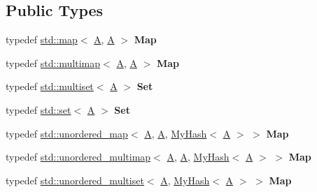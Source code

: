 \subsection*{Public Types}
\begin{DoxyCompactItemize}
\item 
\mbox{\label{struct_a_ac2592255bb77167f73795fba79ede1ea}} 
typedef \mbox{\hyperlink{classstd_1_1map}{std\+::map}}$<$ \mbox{\hyperlink{struct_a}{A}}, \mbox{\hyperlink{struct_a}{A}} $>$ {\bfseries Map}
\item 
\mbox{\label{struct_a_a9c1ebc47bec4cd6aba82fd759a0db654}} 
typedef \mbox{\hyperlink{classstd_1_1multimap}{std\+::multimap}}$<$ \mbox{\hyperlink{struct_a}{A}}, \mbox{\hyperlink{struct_a}{A}} $>$ {\bfseries Map}
\item 
\mbox{\label{struct_a_aa23dfbc23c3121c3321f87ab2245efbb}} 
typedef \mbox{\hyperlink{classstd_1_1multiset}{std\+::multiset}}$<$ \mbox{\hyperlink{struct_a}{A}} $>$ {\bfseries Set}
\item 
\mbox{\label{struct_a_a2d547aef0a54b129cbd44064296c425b}} 
typedef \mbox{\hyperlink{classstd_1_1set}{std\+::set}}$<$ \mbox{\hyperlink{struct_a}{A}} $>$ {\bfseries Set}
\item 
\mbox{\label{struct_a_a95808cd6576c1c045edcd5d4c1875614}} 
typedef \mbox{\hyperlink{classstd_1_1unordered__map}{std\+::unordered\+\_\+map}}$<$ \mbox{\hyperlink{struct_a}{A}}, \mbox{\hyperlink{struct_a}{A}}, \mbox{\hyperlink{struct_my_hash}{My\+Hash}}$<$ \mbox{\hyperlink{struct_a}{A}} $>$ $>$ {\bfseries Map}
\item 
\mbox{\label{struct_a_a6422cb69984deaa01771e492aca37bc1}} 
typedef \mbox{\hyperlink{classstd_1_1unordered__multimap}{std\+::unordered\+\_\+multimap}}$<$ \mbox{\hyperlink{struct_a}{A}}, \mbox{\hyperlink{struct_a}{A}}, \mbox{\hyperlink{struct_my_hash}{My\+Hash}}$<$ \mbox{\hyperlink{struct_a}{A}} $>$ $>$ {\bfseries Map}
\item 
\mbox{\label{struct_a_a22384dd933a48d7554b21f44a6bb9449}} 
typedef \mbox{\hyperlink{classstd_1_1unordered__multiset}{std\+::unordered\+\_\+multiset}}$<$ \mbox{\hyperlink{struct_a}{A}}, \mbox{\hyperlink{struct_my_hash}{My\+Hash}}$<$ \mbox{\hyperlink{struct_a}{A}} $>$ $>$ {\bfseries Map}

\end{DoxyCompactItemize}
